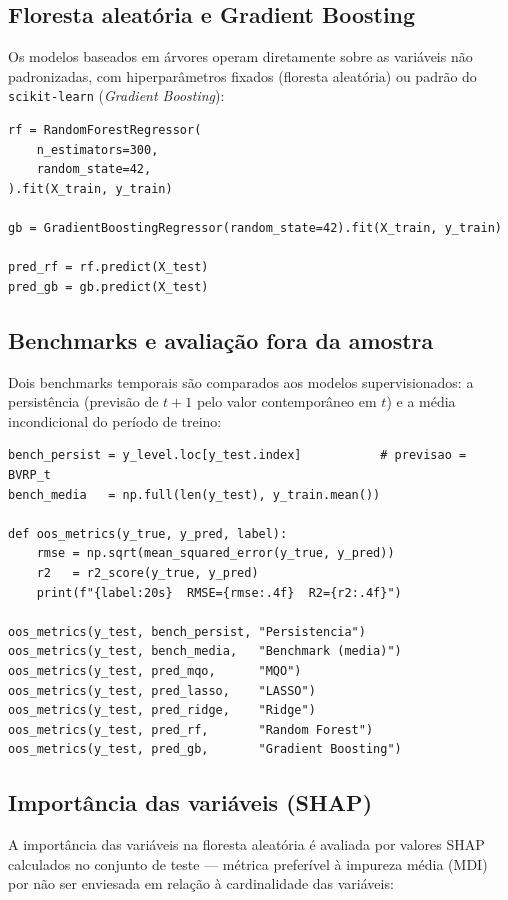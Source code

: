 \subsection{Floresta aleatória e Gradient Boosting}

Os modelos baseados em árvores operam diretamente sobre as variáveis não
padronizadas, com hiperparâmetros fixados (floresta aleatória) ou padrão do
\texttt{scikit-learn} (\textit{Gradient Boosting}):

\begin{verbatim}
rf = RandomForestRegressor(
    n_estimators=300,
    random_state=42,
).fit(X_train, y_train)

gb = GradientBoostingRegressor(random_state=42).fit(X_train, y_train)

pred_rf = rf.predict(X_test)
pred_gb = gb.predict(X_test)
\end{verbatim}

\subsection{Benchmarks e avaliação fora da amostra}

Dois benchmarks temporais são comparados aos modelos supervisionados: a
persistência (previsão de $t+1$ pelo valor contemporâneo em $t$) e a média
incondicional do período de treino:

\begin{verbatim}
bench_persist = y_level.loc[y_test.index]           # previsao = BVRP_t
bench_media   = np.full(len(y_test), y_train.mean())

def oos_metrics(y_true, y_pred, label):
    rmse = np.sqrt(mean_squared_error(y_true, y_pred))
    r2   = r2_score(y_true, y_pred)
    print(f"{label:20s}  RMSE={rmse:.4f}  R2={r2:.4f}")

oos_metrics(y_test, bench_persist, "Persistencia")
oos_metrics(y_test, bench_media,   "Benchmark (media)")
oos_metrics(y_test, pred_mqo,      "MQO")
oos_metrics(y_test, pred_lasso,    "LASSO")
oos_metrics(y_test, pred_ridge,    "Ridge")
oos_metrics(y_test, pred_rf,       "Random Forest")
oos_metrics(y_test, pred_gb,       "Gradient Boosting")
\end{verbatim}

\subsection{Importância das variáveis (SHAP)}

A importância das variáveis na floresta aleatória é avaliada por valores SHAP
calculados no conjunto de teste --- métrica preferível à impureza média (MDI)
por não ser enviesada em relação à cardinalidade das variáveis:


